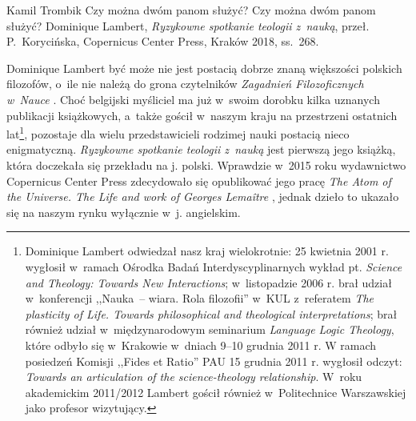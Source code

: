 \begin{recplenv}{Kamil Trombik}
	{Czy można dwóm panom służyć?}
	{Czy można dwóm panom służyć?}
	{Dominique Lambert, \textit{Ryzykowne spotkanie teologii z~nauką}, przeł. P.~Korycińska, Copernicus Center Press, Kraków 2018,
		ss.~268.}




Dominique Lambert być może nie jest postacią dobrze znaną większości polskich filozofów, o~ile nie należą do grona
czytelników \textit{Zagadnień Filozoficznych w~Nauce}
\parencite{lambert_relativites_2005}.
Choć belgijski myśliciel ma już w~swoim dorobku kilka uznanych publikacji książkowych, a~także gościł w~naszym
kraju na przestrzeni ostatnich lat\footnote{Dominique Lambert odwiedzał nasz kraj wielokrotnie: 25 kwietnia 2001 r.
wygłosił w~ramach Ośrodka Badań Interdyscyplinarnych wykład pt. \textit{Science and Theo\-logy: Towards New
Interactions}; w~listopadzie 2006 r. brał udział w~konferencji ,,Nauka~-- wiara. Rola filozofii'' w~KUL z~referatem
\textit{The plasticity of Life. Towards philosophical and theological interpretations}; brał również
udział w~międzynarodowym seminarium \textit{Language Logic Theology}, które odbyło się w~Krakowie w~dniach 9–10 grudnia 2011 r.
W ramach posiedzeń Komisji ,,Fides et Ratio'' PAU 15 grudnia 2011 r. wygłosił odczyt: \textit{Towards an articulation of
the science-theology relationship}. W~roku akademickim 2011/2012 Lambert gościł również w~Politechnice Warszawskiej
jako profesor wizytujący. }, pozostaje dla wielu przedstawicieli rodzimej nauki postacią nieco enigmatyczną.
\textit{Ryzykowne spotkanie teologii z~nauką} jest pierwszą jego książką, która doczekała się przekładu na j. polski.
Wprawdzie w~2015 roku wydawnictwo Copernicus Center Press zdecydowało się opublikować jego pracę \textit{The Atom of
the Universe. The Life and work of Georges Lemaître}
\parencite{lambert_atom_2015},
jednak dzieło to
ukazało się na naszym rynku wyłącznie w~j. angielskim. 


\end{recplenv}
